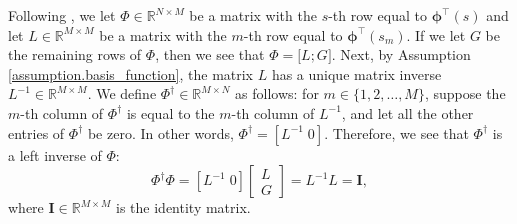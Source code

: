 \documentclass[11pt, notitlepage]{article}
\newcommand{\R}{\mathbb{R}}
\newcommand{\1}{\mathbbm{1}}
\begin{document}
Following \cite{tsitsiklis1996feature}, we let $\Phi \in \R^{N\times M}$ be a matrix with the $s$-th row equal to $\boldsymbol{\phi}^\intercal (s)$ and let $L\in \R^{M\times M}$ be a matrix with the $m$-th row equal to $\boldsymbol{\phi}^\intercal (s_m)$. If we let $G$ be the remaining rows of $\Phi$, then we see that $\Phi = \bigl[L; G\bigl]$. Next, by Assumption \ref{assumption.basis_function}, the matrix $L$ has a unique matrix inverse $L^{-1} \in \R^{M\times M}$. We define $\Phi^{\dagger} \in \R^{M\times N}$ as follows: for $m \in \{1, 2, \ldots, M\}$, suppose the $m$-th column of $\Phi^{\dagger}$ is equal to the $m$-th column of $L^{-1}$, and let all the other entries of $\Phi^{\dagger}$ be zero. In other words, $\Phi^{\dagger} = [L^{-1} \; 0]$. Therefore, we see that $\Phi^{\dagger}$ is a left inverse of $\Phi$:
\begin{equation*}
    \Phi^{\dagger} \Phi = [L^{-1} \; 0] \begin{bmatrix}L\\ G\end{bmatrix} = L^{-1} L = \mathbf{I},
\end{equation*}
where $\mathbf{I} \in \R^{M\times M}$ is the identity matrix.
\end{document}
